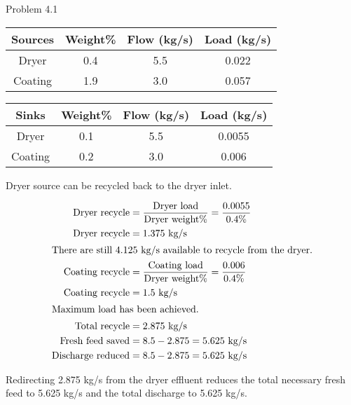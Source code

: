 \item Problem 4.1

\begin{center}
    \begin{tabular}{|c|c|c|c|}
        \hline
        Sources & Weight\% & Flow (kg/s) & Load (kg/s) \\
        \hline
        Dryer & 0.4 & 5.5 & 0.022 \\
        Coating & 1.9 & 3.0 & 0.057 \\
        \hline
    \end{tabular} 
    
    \begin{tabular}{|c|c|c|c|}
        \hline
        Sinks & Weight\% & Flow (kg/s) & Load (kg/s) \\
        \hline
        Dryer & 0.1 & 5.5 & 0.0055 \\
        Coating & 0.2 & 3.0 & 0.006 \\
        \hline
    \end{tabular} 
\end{center}

Dryer source can be recycled back to the dryer inlet.

\begin{align*}
    \text{Dryer recycle} &= \frac{\text{Dryer load}}{\text{Dryer weight\%}} = \frac{0.0055}{0.4\%} \\
    \text{Dryer recycle} &= 1.375 \text{ kg/s} \\
    \intertext{There are still 4.125 kg/s available to recycle from the dryer.}
    \text{Coating recycle} &= \frac{\text{Coating load}}{\text{Dryer weight\%}} = \frac{0.006}{0.4\%} \\
    \text{Coating recycle} &= 1.5 \text{ kg/s} \\
    \intertext{Maximum load has been achieved.}
    \text{Total recycle} &= 2.875 \text{ kg/s} \\
    \text{Fresh feed saved} &= 8.5 - 2.875 = 5.625 \text{ kg/s} \\
    \text{Discharge reduced} &= 8.5 - 2.875 = 5.625 \text{ kg/s} \\
\end{align*}

Redirecting 2.875 kg/s from the dryer effluent reduces the total necessary fresh feed to 5.625 kg/s and the total discharge to 5.625 kg/s. 